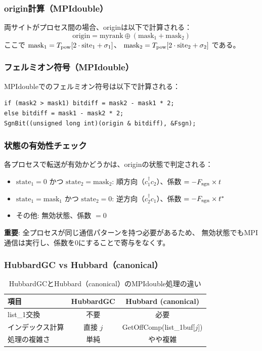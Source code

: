 \documentclass[11pt,a4paper]{article}
\begin{document}
\subsubsection{origin計算（MPIdouble）}

両サイトがプロセス間の場合、originは以下で計算される：
\begin{equation}
  \text{origin} = \text{myrank} \oplus (\text{mask}_1 + \text{mask}_2)
\end{equation}
ここで $\text{mask}_1 = T_{\rm pow}[2 \cdot \text{site}_1 + \sigma_1]$、
$\text{mask}_2 = T_{\rm pow}[2 \cdot \text{site}_2 + \sigma_2]$ である。

\subsubsection{フェルミオン符号（MPIdouble）}

MPIdoubleでのフェルミオン符号は以下で計算される：
\begin{lstlisting}[caption=MPIdoubleフェルミオン符号の計算]
if (mask2 > mask1) bitdiff = mask2 - mask1 * 2;
else bitdiff = mask1 - mask2 * 2;
SgnBit((unsigned long int)(origin & bitdiff), &Fsgn);
\end{lstlisting}

\subsubsection{状態の有効性チェック}

各プロセスで転送が有効かどうかは、originの状態で判定される：
\begin{itemize}
  \item $\text{state}_1 = 0$ かつ $\text{state}_2 = \text{mask}_2$:
        順方向（$c^\dagger_1 c_2$）、係数 $= -F_{\rm sgn} \times t$
  \item $\text{state}_1 = \text{mask}_1$ かつ $\text{state}_2 = 0$:
        逆方向（$c^\dagger_2 c_1$）、係数 $= -F_{\rm sgn} \times t^*$
  \item その他: 無効状態、係数 $= 0$
\end{itemize}

\textbf{重要}: 全プロセスが同じ通信パターンを持つ必要があるため、
無効状態でもMPI通信は実行し、係数を0にすることで寄与をなくす。

\subsubsection{HubbardGC vs Hubbard（canonical）}

\begin{table}[h]
\centering
\begin{tabular}{lcc}
\toprule
項目 & HubbardGC & Hubbard (canonical) \\
\midrule
list\_1交換 & 不要 & 必要 \\
インデックス計算 & 直接 $j$ & GetOffComp(list\_1buf[$j$]) \\
処理の複雑さ & 単純 & やや複雑 \\
\bottomrule
\end{tabular}
\caption{HubbardGCとHubbard（canonical）のMPIdouble処理の違い}
\end{table}
\end{document}
